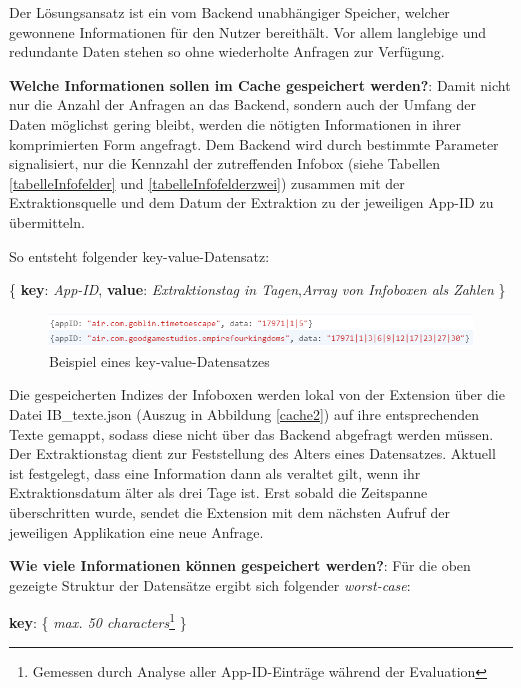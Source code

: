 Der Lösungsansatz ist ein vom Backend unabhängiger Speicher, welcher gewonnene Informationen für den Nutzer bereithält. Vor allem langlebige und redundante Daten stehen so ohne wiederholte Anfragen zur Verfügung.


\textbf{Welche Informationen sollen im Cache gespeichert werden?}:
Damit nicht nur die Anzahl der Anfragen an das Backend, sondern auch der Umfang der Daten möglichst gering bleibt, werden die nötigten Informationen in ihrer komprimierten Form angefragt. Dem Backend wird durch bestimmte Parameter signalisiert, nur die Kennzahl der zutreffenden Infobox (siehe Tabellen \ref{tabelleInfofelder} und  \ref{tabelleInfofelderzwei}) zusammen mit der Extraktionsquelle und dem Datum der Extraktion zu der jeweiligen App-ID zu übermitteln.

So entsteht folgender key-value-Datensatz:

\big\{ \textbf{key}: \textit{App-ID}, \textbf{value}: \textit{Extraktionstag in Tagen},\textit{Array von Infoboxen als Zahlen} \big\}

\begin{figure}[ht]
	\centering
	\includegraphics[width=1\textwidth]{pics/cache1.png}
	\caption{Beispiel eines key-value-Datensatzes}
	\label{cache1}
\end{figure}


Die gespeicherten Indizes der Infoboxen werden lokal von der Extension über die Datei \glqq IB\_texte.json \grqq{} (Auszug in Abbildung \ref{cache2}) auf ihre entsprechenden Texte gemappt, sodass diese nicht über das Backend abgefragt werden müssen. Der Extraktionstag dient zur Feststellung des Alters eines Datensatzes. Aktuell ist festgelegt, dass eine Information dann als veraltet gilt, wenn ihr Extraktionsdatum älter als drei Tage ist. Erst sobald die Zeitspanne überschritten wurde, sendet die Extension mit dem nächsten Aufruf der jeweiligen Applikation eine neue Anfrage.




\textbf{Wie viele Informationen können gespeichert werden?}:
Für die oben gezeigte Struktur der Datensätze ergibt sich folgender \textit{worst-case}:

\textbf{key}: \big\{ \textit{max. 50 characters}\footnote{Gemessen durch Analyse aller App-ID-Einträge während der Evaluation} \big\}

